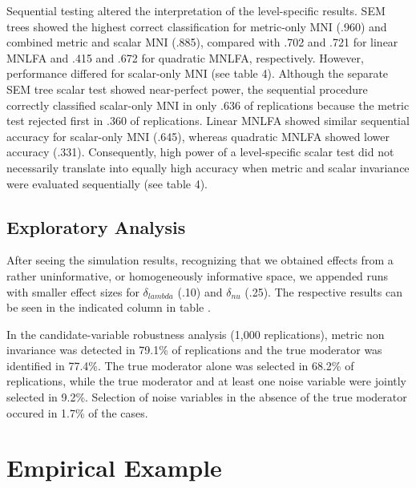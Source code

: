 \documentclass[
  man,
  floatsintext]{apa7}
\begin{document}
Sequential testing altered the interpretation of the level-specific
results. SEM trees showed the highest correct classification for
metric-only MNI (.960) and combined metric and scalar MNI (.885),
compared with .702 and .721 for linear MNLFA and .415 and .672 for
quadratic MNLFA, respectively. However, performance differed for
scalar-only MNI (see table 4). Although the separate SEM tree scalar
test showed near-perfect power, the sequential procedure correctly
classified scalar-only MNI in only .636 of replications because the
metric test rejected first in .360 of replications. Linear MNLFA showed
similar sequential accuracy for scalar-only MNI (.645), whereas
quadratic MNLFA showed lower accuracy (.331). Consequently, high power
of a level-specific scalar test did not necessarily translate into
equally high accuracy when metric and scalar invariance were evaluated
sequentially (see table 4).

\subsection{Exploratory Analysis}\label{exploratory-analysis}

After seeing the simulation results, recognizing that we obtained
effects from a rather uninformative, or homogeneously informative space,
we appended runs with smaller effect sizes for \(\delta_{lambda}\) (.10)
and \(\delta_{nu}\) (.25). The respective results can be seen in the
indicated column in table .

In the candidate-variable robustness analysis (1,000 replications),
metric non invariance was detected in 79.1\% of replications and the
true moderator was identified in 77.4\%. The true moderator alone was
selected in 68.2\% of replications, while the true moderator and at
least one noise variable were jointly selected in 9.2\%. Selection of
noise variables in the absence of the true moderator occured in 1.7\% of
the cases.

\section{Empirical Example}\label{empirical-example}
\end{document}
